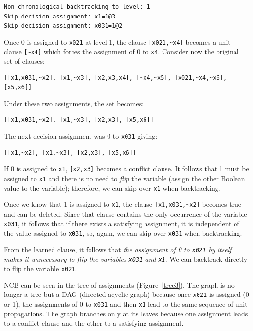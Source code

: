 \documentclass[11pt]{report}
\newcommand*{\p}[1]{\textup{\texttt{#1}}}
\begin{document}
\begin{verbatim}
Non-chronological backtracking to level: 1
Skip decision assignment: x1=1@3
Skip decision assignment: x031=1@2
\end{verbatim}

Once 0 is assigned to \p{x021} at level 1, the clause \verb+[x021,~x4]+
becomes a unit clause \verb+[~x4]+ which forces the assignment of 0 to
\p{x4}. Consider now the original set of clauses:

\begin{verbatim}
[[x1,x031,~x2], [x1,~x3], [x2,x3,x4], [~x4,~x5], [x021,~x4,~x6], [x5,x6]]
\end{verbatim}
Under these two assignments, the set becomes:
\begin{verbatim}
[[x1,x031,~x2], [x1,~x3], [x2,x3], [x5,x6]]
\end{verbatim}
The next decision assignment was 0 to \p{x031} giving:
\begin{verbatim}
[[x1,~x2], [x1,~x3], [x2,x3], [x5,x6]]
\end{verbatim}

If 0 is assigned to \p{x1}, \p{[x2,x3]} becomes a conflict clause. It
follows that 1 must be assigned to \p{x1} and there is no need to
\emph{flip} the variable (assign the other Boolean value to the
variable); therefore, we can skip over \p{x1} when backtracking.

Once we know that 1 is assigned to \p{x1}, the clause
\verb+[x1,x031,~x2]+ becomes true and can be deleted. Since that clause
contains the only occurrence of the variable \p{x031}, it follows that if
there exists a satisfying assignment, it is independent of the value
assigned to \p{x031}, so, again, we can skip over \p{x031} when
backtracking.

From the learned clause, it follows that \emph{the assignment of 0
to \p{x021} by itself makes it unnecessary to flip the variables
\p{x031} and \p{x1}}. We can backtrack directly to flip the variable
\p{x021}.

NCB can be seen in the tree of assignments (Figure~\ref{tree3}). The
graph is no longer a tree but a DAG (directed acyclic graph) because
once \p{x021} is assigned (0 or 1), the assignments of 0 to \p{x031} and
then \p{x1} lead to the same sequence of unit propagations. The graph
branches only at its leaves because one assignment leads to a conflict
clause and the other to a satisfying assignment.
\end{document}
